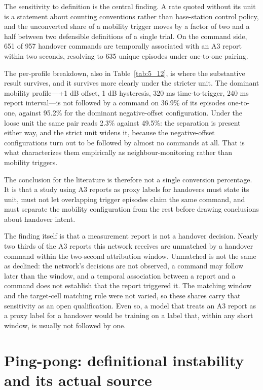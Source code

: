 The sensitivity to definition is the central finding. A rate quoted without its unit is a statement about counting conventions rather than base-station control policy, and the unconverted share of a mobility trigger moves by a factor of two and a half between two defensible definitions of a single trial. On the command side, 651 of 957 handover commands are temporally associated with an A3 report within two seconds, resolving to 635 unique episodes under one-to-one pairing.

The per-profile breakdown, also in Table~\ref{tab:5_12}, is where the substantive result survives, and it survives more clearly under the stricter unit. The dominant mobility profile---+1 dB offset, 1 dB hysteresis, 320 ms time-to-trigger, 240 ms report interval---is not followed by a command on 36.9\% of its episodes one-to-one, against 95.2\% for the dominant negative-offset configuration. Under the loose unit the same pair reads 2.3\% against 49.5\%: the separation is present either way, and the strict unit widens it, because the negative-offset configurations turn out to be followed by almost no commands at all. That is what characterizes them empirically as neighbour-monitoring rather than mobility triggers.

The conclusion for the literature is therefore not a single conversion percentage. It is that a study using A3 reports as proxy labels for handovers must state its unit, must not let overlapping trigger episodes claim the same command, and must separate the mobility configuration from the rest before drawing conclusions about handover intent.

The finding itself is that a measurement report is not a handover decision. Nearly two thirds of the A3 reports this network receives are unmatched by a handover command within the two-second attribution window. Unmatched is not the same as declined: the network's decisions are not observed, a command may follow later than the window, and a temporal association between a report and a command does not establish that the report triggered it. The matching window and the target-cell matching rule were not varied, so these shares carry that sensitivity as an open qualification. Even so, a model that treats an A3 report as a proxy label for a handover would be training on a label that, within any short window, is usually not followed by one.


\section{Ping-pong: definitional instability and its actual source}
\label{sec:5_10}

